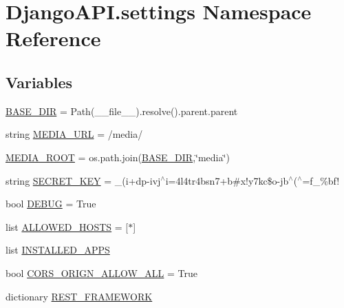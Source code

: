 \hypertarget{namespace_django_a_p_i_1_1settings}{}\section{Django\+A\+P\+I.\+settings Namespace Reference}
\label{namespace_django_a_p_i_1_1settings}
\subsection*{Variables}
\begin{DoxyCompactItemize}
\item 
\hyperlink{namespace_django_a_p_i_1_1settings_aa4206fd693821bde347488970ae5e8d1}{B\+A\+S\+E\+\_\+\+D\+IR} = Path(\+\_\+\+\_\+file\+\_\+\+\_\+).resolve().parent.\+parent
\item 
string \hyperlink{namespace_django_a_p_i_1_1settings_a0b57c8996228ba7301168e030e102481}{M\+E\+D\+I\+A\+\_\+\+U\+RL} = \textquotesingle{}/media/\textquotesingle{}
\item 
\hyperlink{namespace_django_a_p_i_1_1settings_ac2df8270e4737f7aa5487956dc84ab4b}{M\+E\+D\+I\+A\+\_\+\+R\+O\+OT} = os.\+path.\+join(\hyperlink{namespace_django_a_p_i_1_1settings_aa4206fd693821bde347488970ae5e8d1}{B\+A\+S\+E\+\_\+\+D\+IR},\char`\"{}media\char`\"{})
\item 
string \hyperlink{namespace_django_a_p_i_1_1settings_ab6f6ca736c1a8bc3c62ed63bdf02dd22}{S\+E\+C\+R\+E\+T\+\_\+\+K\+EY} = \textquotesingle{}\+\_(i+dp-\/ivj$^\wedge$i=4l4tr4bsn7+b\#x!y7kc\$o-\/jb$^\wedge$($^\wedge$=f\+\_\+\%bf!\textquotesingle{}
\item 
bool \hyperlink{namespace_django_a_p_i_1_1settings_aff6a8139320ed9d10a1716473b446409}{D\+E\+B\+UG} = True
\item 
list \hyperlink{namespace_django_a_p_i_1_1settings_adfe3993c840e4478337c74962ad26a96}{A\+L\+L\+O\+W\+E\+D\+\_\+\+H\+O\+S\+TS} = \mbox{[}\textquotesingle{}$\ast$\textquotesingle{}\mbox{]}
\item 
list \hyperlink{namespace_django_a_p_i_1_1settings_aa71540b2a9c698a339ef61571830b37b}{I\+N\+S\+T\+A\+L\+L\+E\+D\+\_\+\+A\+P\+PS}
\item 
bool \hyperlink{namespace_django_a_p_i_1_1settings_a86436c3d969c270a39fa3e3c73877d15}{C\+O\+R\+S\+\_\+\+O\+R\+I\+G\+N\+\_\+\+A\+L\+L\+O\+W\+\_\+\+A\+LL} = True
\item 
dictionary \hyperlink{namespace_django_a_p_i_1_1settings_a5bcc9686175dbcb797f53acd54124eef}{R\+E\+S\+T\+\_\+\+F\+R\+A\+M\+E\+W\+O\+RK}

\end{DoxyCompactItemize}
